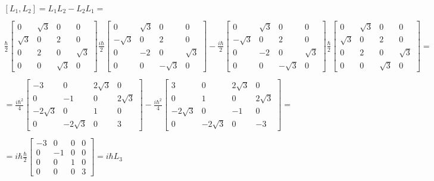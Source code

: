 \begin{equation}
  \begin{array}{c}
    [L_1,L_2] = L_1L_2-L_2L_1 =
    \\

    \\
    \frac{\hbar}{2}\left[\begin{matrix}
      0 & \sqrt{3} & 0 & 0\\
      \sqrt{3} & 0 & 2 & 0\\
      0 & 2 & 0 & \sqrt{3}\\
      0 & 0 & \sqrt{3} & 0
    \end{matrix}\right]\frac{i\hbar}{2}\left[\begin{matrix}
      0 & \sqrt{3} & 0 & 0\\
      -\sqrt{3} & 0 & 2 & 0\\
      0 & -2 & 0 & \sqrt{3}\\
      0 & 0 & -\sqrt{3} & 0
    \end{matrix}\right] -
    \frac{i\hbar}{2}\left[\begin{matrix}
      0 & \sqrt{3} & 0 & 0\\
      -\sqrt{3} & 0 & 2 & 0\\
      0 & -2 & 0 & \sqrt{3}\\
      0 & 0 & -\sqrt{3} & 0
    \end{matrix}\right]\frac{\hbar}{2}\left[\begin{matrix}
      0 & \sqrt{3} & 0 & 0\\
      \sqrt{3} & 0 & 2 & 0\\
      0 & 2 & 0 & \sqrt{3}\\
      0 & 0 & \sqrt{3} & 0
    \end{matrix}\right] =
    \\

    \\
    = \frac{i\hbar^2}{4}\left[\begin{matrix}
      -3 & 0 & 2\sqrt{3} & 0\\
      0 & -1 & 0 & 2\sqrt{3}\\
      -2\sqrt{3} & 0 & 1 & 0\\
      0 & -2\sqrt{3} & 0 & 3
    \end{matrix}\right] - \frac{i\hbar^2}{4}\left[\begin{matrix}
      3 & 0 & 2\sqrt{3} & 0\\
      0 & 1 & 0 & 2\sqrt{3}\\
      -2\sqrt{3} & 0 & -1 & 0\\
      0 & -2\sqrt{3} & 0 & -3
    \end{matrix}\right] =
    \\

    \\
    = i\hbar \frac{\hbar}{2}\left[\begin{matrix}
      -3 & 0 & 0 & 0\\
      0 & -1 & 0 & 0\\
      0 & 0 & 1 & 0\\
      0 & 0 & 0 & 3
    \end{matrix}\right] = i \hbar L_3
  \end{array}
\end{equation}

